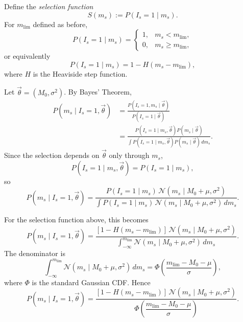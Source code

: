 \documentclass[11pt, titlepage]{article} %
\numberwithin{equation}{section}
\theoremstyle{definition}
\numberwithin{assumption}{section}
\begin{document}
Define the \textit{selection function}
\begin{equation*}
    S(m_s):=P(I_s=1\mid m_s).
\end{equation*}
For $m_{\lim}$ defined as before,
\begin{equation*}
    P(I_s=1\mid m_s)=
    \begin{cases}
        1, & m_s<m_{\mathrm{lim}},\\
        0, & m_s\ge m_{\mathrm{lim}},
    \end{cases}
\end{equation*}
or equivalently
\begin{equation*}
    P(I_s=1\mid m_s)=1-H(m_s-m_{\mathrm{lim}}),
\end{equation*}
where $H$ is the Heaviside step function.

Let $\vec\theta=(M_0,\sigma^2)$. By Bayes' Theorem,
\begin{align*}
    P(m_s\mid I_s=1,\vec\theta)
    &= \frac{P(I_s=1,m_s\mid \vec\theta)}{P(I_s=1\mid \vec\theta)}\\
    &= \frac{P(I_s=1\mid m_s,\vec\theta)P(m_s\mid \vec\theta)}
    {\int P(I_s=1\mid m_s,\vec\theta)P(m_s\mid \vec\theta)\,dm_s}.
\end{align*}
Since the selection depends on $\vec\theta$ only through $m_s$,
\begin{equation*}
    P(I_s=1\mid m_s,\vec\theta)=P(I_s=1\mid m_s),
\end{equation*}
so
\begin{equation*}
    P(m_s\mid I_s=1,\vec\theta)
    =
    \frac{P(I_s=1\mid m_s)\,\mathcal{N}(m_s\mid M_0+\mu,\sigma^2)}
    {\int P(I_s=1\mid m_s)\,\mathcal{N}(m_s\mid M_0+\mu,\sigma^2)\,dm_s}.
\end{equation*}

For the selection function above, this becomes
\begin{equation*}
    P(m_s\mid I_s=1,\vec\theta)
    =
    \frac{[1-H(m_s-m_{\mathrm{lim}})]\,\mathcal{N}(m_s\mid M_0+\mu,\sigma^2)}
    {\int_{-\infty}^{m_{\mathrm{lim}}}\mathcal{N}(m_s\mid M_0+\mu,\sigma^2)\,dm_s}.
\end{equation*}
The denominator is
\begin{equation*}
    \int_{-\infty}^{m_{\mathrm{lim}}}\mathcal{N}(m_s\mid M_0+\mu,\sigma^2)\,dm_s
    =
    \Phi\!\left(\frac{m_{\mathrm{lim}}-M_0-\mu}{\sigma}\right),
\end{equation*}
where $\Phi$ is the standard Gaussian CDF. Hence
\begin{equation*}
    P(m_s\mid I_s=1,\vec\theta)
    =
    \frac{[1-H(m_s-m_{\mathrm{lim}})]\,\mathcal{N}(m_s\mid M_0+\mu,\sigma^2)}
    {\Phi\!\left(\dfrac{m_{\mathrm{lim}}-M_0-\mu}{\sigma}\right)}.
\end{equation*}
\end{document}
